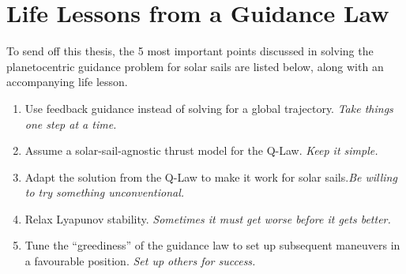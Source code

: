 \section{Life Lessons from a Guidance Law}
To send off this thesis, the 5 most important points discussed in solving the planetocentric guidance problem for solar sails are listed below, along with an accompanying life lesson.

\begin{enumerate}
    \item Use feedback guidance instead of solving for a global trajectory. \newline \textit{Take things one step at a time.}
    \item Assume a solar-sail-agnostic thrust model for the Q-Law. \newline \textit{Keep it simple.}
    \item Adapt the solution from the Q-Law to make it work for solar sails.\newline \textit{Be willing to try something unconventional.}
    \item Relax Lyapunov stability. \newline \textit{Sometimes it must get worse before it gets better.}
    \item Tune the ``greediness'' of the guidance law to set up subsequent maneuvers in a favourable position. \newline \textit{Set up others for success.}
\end{enumerate}